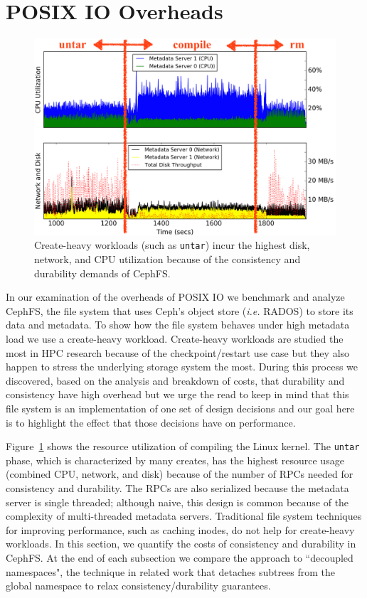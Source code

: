 \section{POSIX IO Overheads}
\label{sec:posix-overheads}

\begin{figure}[tb]
\centering
\includegraphics[width=1\linewidth]{./graphs/overhead-creates.png}
\caption{Create-heavy workloads (such as \texttt{untar}) incur the highest disk, network, and
CPU utilization because of the consistency and durability demands of
CephFS.}\label{fig:overhead-creates}
\end{figure}

In our examination of the overheads of POSIX IO we benchmark and analyze CephFS,
the file system that uses Ceph's object store ({\it i.e.} RADOS) to store its
data and metadata. To show how the file system behaves under high metadata load
we use a create-heavy workload. Create-heavy workloads are studied the most in
HPC research because of the checkpoint/restart use case but they also happen to
stress the underlying storage system the most.  During this process we
discovered, based on the analysis and breakdown of costs, that durability and
consistency have high overhead but we urge the read to keep in mind that this
file system is an implementation of one set of design decisions and our goal
here is to highlight the effect that those decisions have on performance.

Figure~\ref{fig:overhead-creates} shows the resource utilization of compiling
the Linux kernel.  The \texttt{untar} phase, which is characterized by many
creates, has the highest resource usage (combined CPU, network, and disk)
because of the number of RPCs needed for consistency and durability. The RPCs
are also serialized because the metadata server is single threaded; although
naive, this design is common because of the complexity of multi-threaded
metadata servers.  Traditional file system techniques for improving
performance, such as caching inodes, do not help for create-heavy workloads.
In this section, we quantify the costs of consistency and durability in CephFS.
At the end of each subsection we compare the approach to ``decoupled
namespaces", the technique in related work that detaches subtrees from the
global namespace to relax consistency/durability guarantees. 

